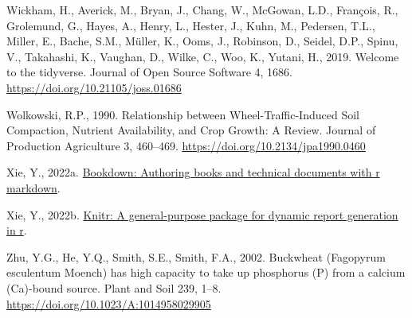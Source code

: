 \documentclass[
  12pt,
]{article}
\newlength{\cslhangindent}
\newlength{\cslentryspacingunit} %
\newenvironment{CSLReferences}[2] %
 {%
  \setlength{\parindent}{0pt}
  \ifodd #1
  \let\oldpar\par
  \def\par{\hangindent=\cslhangindent\oldpar}
  \fi
  \setlength{\parskip}{#2\cslentryspacingunit}
 }%
 {}
\begin{document}
\begin{CSLReferences}{1}{0}
\leavevmode{}%
Wickham, H., Averick, M., Bryan, J., Chang, W., McGowan, L.D., François, R., Grolemund, G., Hayes, A., Henry, L., Hester, J., Kuhn, M., Pedersen, T.L., Miller, E., Bache, S.M., Müller, K., Ooms, J., Robinson, D., Seidel, D.P., Spinu, V., Takahashi, K., Vaughan, D., Wilke, C., Woo, K., Yutani, H., 2019. Welcome to the {tidyverse}. Journal of Open Source Software 4, 1686. \url{https://doi.org/10.21105/joss.01686}

\leavevmode{}%
Wolkowski, R.P., 1990. Relationship between {Wheel-Traffic-Induced Soil Compaction}, {Nutrient Availability}, and {Crop Growth}: {A Review}. Journal of Production Agriculture 3, 460--469. \url{https://doi.org/10.2134/jpa1990.0460}

\leavevmode{}%
Xie, Y., 2022a. \href{https://github.com/rstudio/bookdown}{Bookdown: Authoring books and technical documents with r markdown}.

\leavevmode{}%
Xie, Y., 2022b. \href{https://yihui.org/knitr/}{Knitr: A general-purpose package for dynamic report generation in r}.

\leavevmode{}%
Zhu, Y.G., He, Y.Q., Smith, S.E., Smith, F.A., 2002. Buckwheat ({Fagopyrum} esculentum {Moench}) has high capacity to take up phosphorus ({P}) from a calcium ({Ca})-bound source. Plant and Soil 239, 1--8. \url{https://doi.org/10.1023/A:1014958029905}

\end{CSLReferences}
\end{document}
